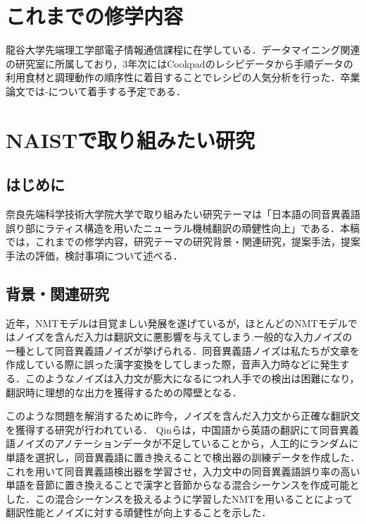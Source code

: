 \documentclass[a4j,10pt, twocolumn]{jarticle} \usepackage[dvipdfmx]{graphicx} \usepackage{amssymb} \usepackage{amsmath}
\begin{document}

\section{これまでの修学内容}
龍谷大学先端理工学部電子情報通信課程に在学している．データマイニング関連の研究室に所属しており，3年次にはCookpadのレシピデータから手順データの利用食材と調理動作の順序性に着目することでレシピの人気分析を行った．卒業論文では-について着手する予定である．
\section{NAISTで取り組みたい研究}
\subsection{はじめに}
奈良先端科学技術大学院大学で取り組みたい研究テーマは「日本語の同音異義語誤り部にラティス構造を用いたニューラル機械翻訳の頑健性向上」である．本稿では，これまでの修学内容，研究テーマの研究背景・関連研究，提案手法，提案手法の評価，検討事項について述べる．

\subsection{背景・関連研究}
近年，NMTモデルは目覚ましい発展を遂げているが，ほとんどのNMTモデルではノイズを含んだ入力は翻訳文に悪影響を与えてしまう\cite{Belinkov}.一般的な入力ノイズの一種として同音異義語ノイズが挙げられる．同音異義語ノイズは私たちが文章を作成している際に誤った漢字変換をしてしまった際，音声入力時などに発生する．このようなノイズは入力文が膨大になるにつれ人手での検出は困難になり，翻訳時に理想的な出力を獲得するための障壁となる．

このような問題を解消するために昨今，ノイズを含んだ入力文から正確な翻訳文を獲得する研究が行われている．
Qinら\cite{Qin}は，中国語から英語の翻訳にて同音異義語ノイズのアノテーションデータが不足していることから，人工的にランダムに単語を選択し，同音異義語に置き換えることで検出器の訓練データを作成した．これを用いて同音異義語検出器を学習させ，入力文中の同音異義語誤り率の高い単語を音節に置き換えることで漢字と音節からなる混合シーケンスを作成可能とした．この混合シーケンスを扱えるように学習したNMTを用いることによって翻訳性能とノイズに対する頑健性が向上することを示した．
\end{document}
